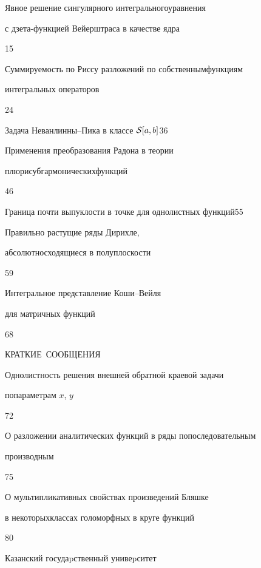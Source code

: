 

{Явное решение сингулярного интегрального\newline уравнения


с дзета-функцией Вейерштраса в качестве ядра}{15}




{Суммируемость по Риссу разложений по собственным\newline функциям


интегральных операторов}{24}




{Задача Неванлинны--Пика в классе ${\cal S}[a,b]$}{36}




{Применения преобразования Радона в теории


плюрисубгармонических\newline функций}{46}




{Граница почти выпуклости в точке для однолистных функций}{55}




{Правильно растущие ряды Дирихле,


абсолютно\newline сходящиеся в полуплоскости}{59}




{Интегральное представление Коши--Вейля


для матричных функций}{68}





\bigskip


\par


\centerline{\Large КРАТКИЕ~СООБЩЕНИЯ}


\bigskip







{Однолистность решения внешней обратной краевой задачи  


по\newline параметрам $x$, $y$}{72}




{О разложении аналитических функций в ряды по\newline последовательным


производным}{75}




{О мультипликативных свойствах произведений Бляшке


в некоторых\newline классах голоморфных в круге функций}{80}








\vfill


\noindent\raisebox{2pt}{\copyright} Казанский госудаpственный унивеpситет





